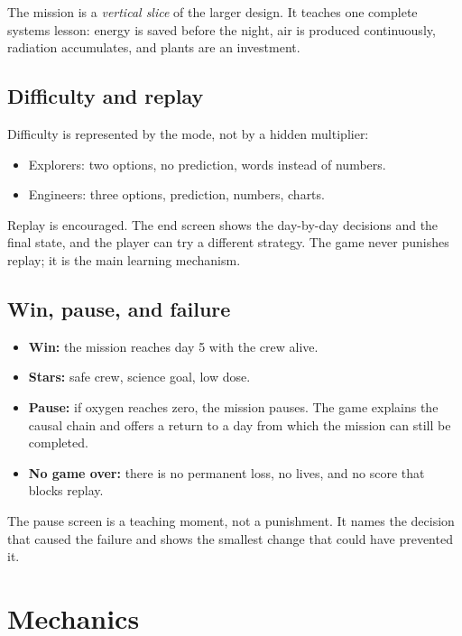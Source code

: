 \documentclass[11pt,a4paper]{article}
\begin{document}
The mission is a \emph{vertical slice} of the larger design. It teaches one complete systems lesson: energy is saved before the night, air is produced continuously, radiation accumulates, and plants are an investment.

\subsection{Difficulty and replay}

Difficulty is represented by the mode, not by a hidden multiplier:

\begin{itemize}
  \item Explorers: two options, no prediction, words instead of numbers.
  \item Engineers: three options, prediction, numbers, charts.
\end{itemize}

Replay is encouraged. The end screen shows the day-by-day decisions and the final state, and the player can try a different strategy. The game never punishes replay; it is the main learning mechanism.

\subsection{Win, pause, and failure}

\begin{itemize}
  \item \textbf{Win:} the mission reaches day 5 with the crew alive.
  \item \textbf{Stars:} safe crew, science goal, low dose.
  \item \textbf{Pause:} if oxygen reaches zero, the mission pauses. The game explains the causal chain and offers a return to a day from which the mission can still be completed.
  \item \textbf{No game over:} there is no permanent loss, no lives, and no score that blocks replay.
\end{itemize}

The pause screen is a teaching moment, not a punishment. It names the decision that caused the failure and shows the smallest change that could have prevented it.

\section{Mechanics}
\end{document}
